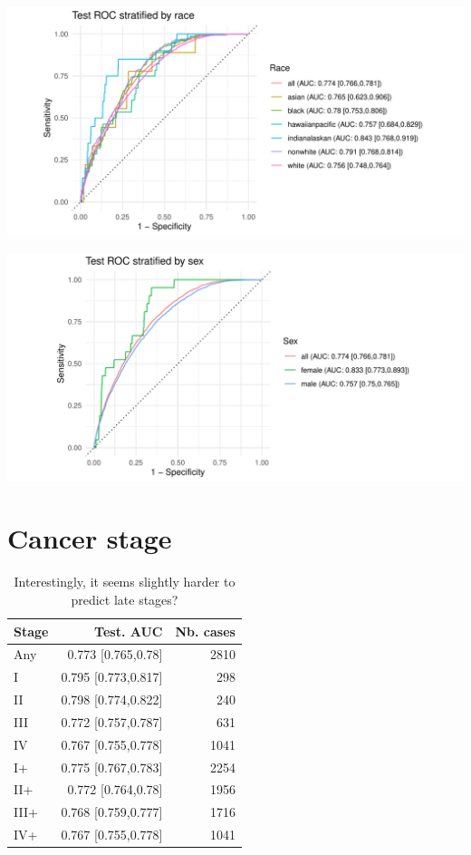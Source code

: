 \documentclass[12pt]{article}
\begin{document}
\begin{center}
\includegraphics[width=\textwidth]{figures/roc_Race.pdf}
\end{center}

\begin{center}
\includegraphics[width=\textwidth]{figures/roc_gender.pdf}
\end{center}



\clearpage
\newpage
\newpage
\newpage


\clearpage
\section*{Cancer stage}

\begin{table}[ht]
\centering
\begin{tabular}{lrr}
  \toprule
 Stage & Test. AUC & Nb. cases \\ 
  \midrule
Any & 0.773 [0.765,0.78] & 2810 \\ \addlinespace
  I & 0.795 [0.773,0.817] & 298 \\ 
  II & 0.798 [0.774,0.822] & 240 \\ 
  III & 0.772 [0.757,0.787] & 631 \\ 
  IV & 0.767 [0.755,0.778] & 1041 \\  \addlinespace
  I+ & 0.775 [0.767,0.783] & 2254 \\ 
  II+ & 0.772 [0.764,0.78] & 1956 \\ 
  III+ & 0.768 [0.759,0.777] & 1716 \\ 
  IV+ & 0.767 [0.755,0.778] & 1041 \\ 
   \bottomrule
\end{tabular}
\caption{Interestingly, it seems slightly harder to predict late stages?}
\end{table}
\end{document}
